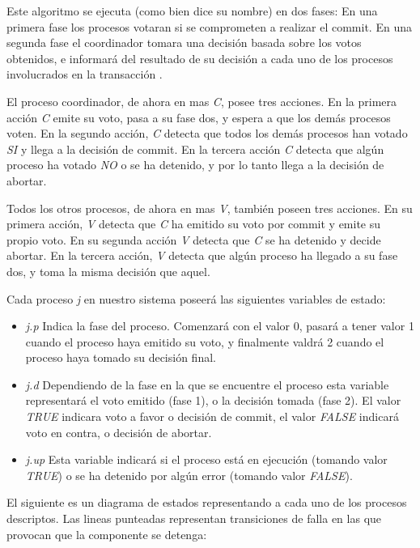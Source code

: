 \documentclass[titlepage, 12pt]{book}
\begin{document}
Este algoritmo se ejecuta (como bien dice su nombre) en dos fases: En una primera fase los procesos votaran si se comprometen a realizar el commit. En una segunda fase el coordinador tomara una decisi\'on basada sobre los votos obtenidos, e informar\'a del resultado de su decisi\'on a cada uno de los procesos involucrados en la transacci\'on \cite{Arora}.

El proceso coordinador, de ahora en mas \textit{C}, posee tres acciones. En la primera acci\'on \textit{C} emite su voto, pasa a su fase dos, y espera a que los dem\'as procesos voten. En la segundo acci\'on, \textit{C} detecta que todos los dem\'as procesos han votado \textit{SI} y llega a la decisi\'on de commit. En la tercera acci\'on \textit{C} detecta que alg\'un proceso ha votado \textit{NO} o se ha detenido, y por lo tanto llega a la decisi\'on de abortar.

Todos los otros procesos, de ahora en mas \textit{V}, tambi\'en poseen tres acciones. En su primera acci\'on, \textit{V} detecta que \textit{C} ha emitido su voto por commit y emite su propio voto. En su segunda acci\'on \textit{V} detecta que \textit{C} se ha detenido y decide abortar. En la tercera acci\'on, \textit{V} detecta que alg\'un proceso ha llegado a su fase dos, y toma la misma decisi\'on que aquel.

Cada proceso \textit{j} en nuestro sistema poseer\'a las siguientes variables de estado:
\begin{itemize}
\item \textit{j.p} Indica la fase del proceso. Comenzar\'a con el valor 0, pasar\'a a tener valor 1 cuando el proceso haya emitido su voto, y finalmente valdr\'a 2 cuando el proceso haya tomado su decisi\'on final.
\item \textit{j.d} Dependiendo de la fase en la que se encuentre el proceso esta variable representar\'a el voto emitido (fase 1), o la decisi\'on tomada (fase 2). El valor \textit{TRUE} indicara voto a favor o decisi\'on de commit, el valor \textit{FALSE} indicar\'a voto en contra, o decisi\'on de abortar.
\item \textit{j.up} Esta variable indicar\'a si el proceso est\'a en ejecuci\'on (tomando valor \textit{TRUE}) o se ha detenido por alg\'un error (tomando valor \textit{FALSE}).
\end{itemize}

El siguiente es un diagrama de estados representando a cada uno de los procesos descriptos. Las lineas punteadas representan transiciones de falla en las que provocan que la componente se detenga:
\end{document}
